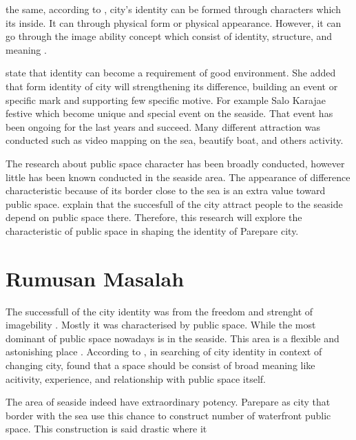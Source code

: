 \documentclass[11pt]{simart} %
\begin{document}
the same, according to \cite{hartanti2014}, city's identity can be formed through characters which its inside. It can through physical form or physical appearance. However, it can go through the image ability concept which consist of identity, structure, and meaning \citep{lycnh1984}.

\cite{hartanti2014} state that identity can become a requirement of good environment. She added that form identity of city will strengthening its difference, building an event or specific mark and supporting few specific motive. For example Salo Karajae festive which become unique and special event on the seaside. That event has been ongoing for the last years and succeed. Many different attraction was conducted such as video mapping on the sea, beautify boat, and others activity.

The research about public space character has been broadly conducted, however little has been known conducted in the seaside area. The appearance of difference characteristic because of its border close to the sea is an extra value toward public space.
\cite{hussein2014} explain that the succesfull of the city attract people to the seaside depend on public space there. Therefore, this research will explore the characteristic of public space in shaping the identity of Parepare city.

\section{Rumusan Masalah}

The successfull of the city identity was from the freedom and strenght of imagebility \citep{oktay2002}. Mostly it was characterised by public space. While the most dominant of public space nowadays is in the seaside.
This area is a flexible and astonishing place \citep{hussein2014}. According to \cite{oktay2002}, in searching of city identity in context of changing city, found that a space should be consist of broad meaning like acitivity, experience, and relationship with public space itself.

The area of seaside indeed have extraordinary potency. Parepare as city that border with the sea use this chance to construct number of waterfront public space. This construction is said drastic where it
\end{document}

